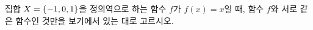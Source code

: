 집합 $X=\{-1{,}\mkern3mu\mathopen{}0{,}\mkern3mu\mathopen{}1\}$을 정의역으로 하는 함수 $f$가 $f(x)=x$일 때, 함수 $f$와 서로 같은 함수인 것만을 보기에서 있는 대로 고르시오.  
